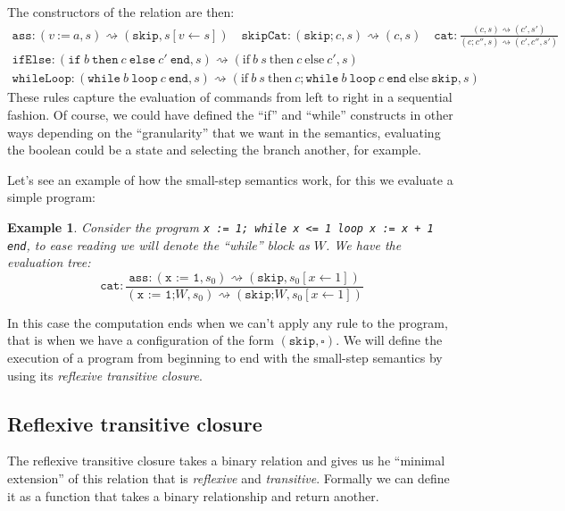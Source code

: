 \documentclass[
  a4paper, 
  10pt, 
  parskip=half, 
  DIV=20,
  toc=bibliography,
  usegeometry,
]{scrartcl}
\newtheorem{example}[theorem]{Example}
\begin{document}
The constructors of the relation are then:
\[
\begin{gathered}
  \texttt{ass}: (v \ \texttt{:=} \ a, s) \rightsquigarrow (\texttt{skip}, s[v \leftarrow s]) \quad
  \texttt{skipCat}: (\texttt{skip}; c, s) \rightsquigarrow (c, s) \quad
  \texttt{cat}: \frac{(c, s) \rightsquigarrow (c', s')}{(c; c'', s) \rightsquigarrow (c', c'', s')} \\
  \texttt{ifElse}: (\texttt{if} \ b \ \texttt{then} \ c \ \texttt{else} \ c' \ \texttt{end}, s)
    \rightsquigarrow (\text{if} \ b \ s \ \text{then} \ c \ \text{else} \ c', s) \\
  \texttt{whileLoop}: (\texttt{while} \ b \ \texttt{loop} \ c \ \texttt{end}, s)
    \rightsquigarrow (\text{if} \ b \ s \ \text{then} \ c;\texttt{while} \ b \ \texttt{loop} \ c \ \texttt{end}  \ \text{else} \ \texttt{skip}, s) 
\end{gathered}
\]
These rules capture the evaluation of commands from left to right in a sequential
fashion. Of course, we could have defined the \enquote{if} and \enquote{while}
constructs in other ways depending on the \enquote{granularity} that we want
in the semantics, evaluating the boolean could be a state and selecting the branch
another, for example. 

Let's see an example of how the small-step semantics work, for this we evaluate a
simple program:
\begin{example}\label{ex:small_step}
  Consider the program \texttt{x := 1; while x <= 1 loop x := x + 1 end},
  to ease reading we will denote the \enquote{while} block as \(W\).
  We have the evaluation tree:
  \[
  \texttt{cat}: \frac{
    \texttt{ass}: (\texttt{x := 1} , s_0) \rightsquigarrow (\texttt{skip}, s_0[x \leftarrow 1])
  }
  {(\texttt{x := 1;} W, s_0)
  \rightsquigarrow
  (\texttt{skip;} W, s_0[x \leftarrow 1])
  }
  \]
\end{example}

In this case the computation ends when we can't apply any rule to the program, 
that is when we have a configuration of the form \((\texttt{skip}, \square)\).
We will define the execution of a program from beginning to end with the small-step
semantics by using its \emph{reflexive transitive closure}.

\subsection{Reflexive transitive closure}

The reflexive transitive closure takes a binary relation and gives us he 
\enquote{minimal extension} of this relation that is \emph{reflexive}
and \emph{transitive}. Formally we can define it as a function that 
takes a binary relationship and return another.
\end{document}
